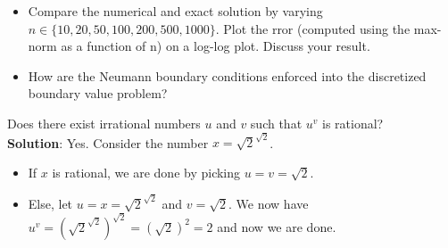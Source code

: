 \documentclass{article}
\newcommand{\soln}{\\ \textbf{Solution}: }
\newcommand{\bkt}[1]{\left(#1\right)}
\begin{document}
\begin{enumerate}
\begin{itemize}
    \item Compare the numerical and exact solution by varying $n \in
        \{10,20,50,100,200,500,1000\}$. Plot the rror (computed using the max-norm as a
        function of n) on a log-log plot. Discuss your result.

    \item How are the Neumann boundary conditions enforced into the discretized boundary
        value problem?

\end{itemize}





		Does there exist irrational numbers $u$ and $v$ such that $u^v$ is rational?
		\soln
		Yes. Consider the number $x=\sqrt2^{\sqrt2}$.
		\begin{itemize}
			\item
			If $x$ is rational, we are done by picking $u=v = \sqrt2$.
			\item
			Else, let $u=x=\sqrt2^{\sqrt2}$ and $v=\sqrt2$. We now have $u^v = \bkt{\sqrt2^{\sqrt2}}^{\sqrt2} = \bkt{\sqrt2}^2 = 2$ and now we are done.
		\end{itemize}

\end{enumerate}
\end{document}
